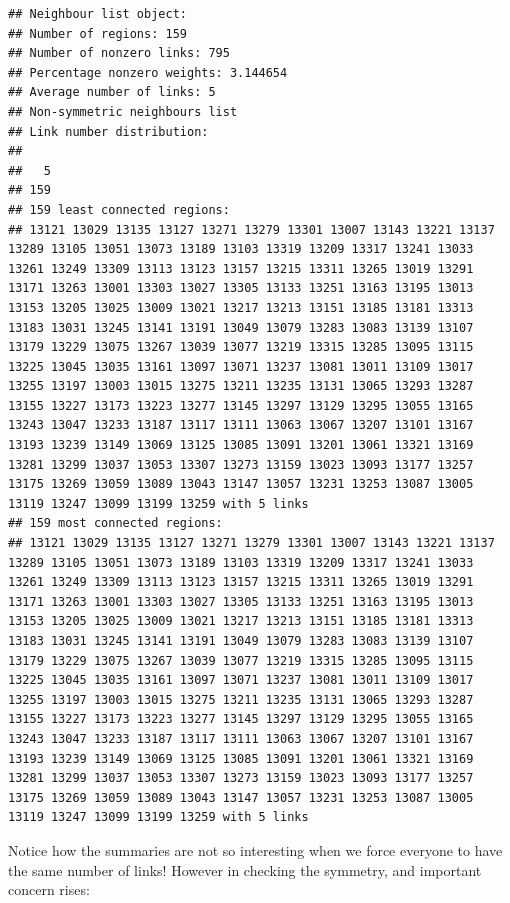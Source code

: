 \documentclass[
]{book}
\begin{document}
\begin{lstlisting}
## Neighbour list object:
## Number of regions: 159 
## Number of nonzero links: 795 
## Percentage nonzero weights: 3.144654 
## Average number of links: 5 
## Non-symmetric neighbours list
## Link number distribution:
## 
##   5 
## 159 
## 159 least connected regions:
## 13121 13029 13135 13127 13271 13279 13301 13007 13143 13221 13137 13289 13105 13051 13073 13189 13103 13319 13209 13317 13241 13033 13261 13249 13309 13113 13123 13157 13215 13311 13265 13019 13291 13171 13263 13001 13303 13027 13305 13133 13251 13163 13195 13013 13153 13205 13025 13009 13021 13217 13213 13151 13185 13181 13313 13183 13031 13245 13141 13191 13049 13079 13283 13083 13139 13107 13179 13229 13075 13267 13039 13077 13219 13315 13285 13095 13115 13225 13045 13035 13161 13097 13071 13237 13081 13011 13109 13017 13255 13197 13003 13015 13275 13211 13235 13131 13065 13293 13287 13155 13227 13173 13223 13277 13145 13297 13129 13295 13055 13165 13243 13047 13233 13187 13117 13111 13063 13067 13207 13101 13167 13193 13239 13149 13069 13125 13085 13091 13201 13061 13321 13169 13281 13299 13037 13053 13307 13273 13159 13023 13093 13177 13257 13175 13269 13059 13089 13043 13147 13057 13231 13253 13087 13005 13119 13247 13099 13199 13259 with 5 links
## 159 most connected regions:
## 13121 13029 13135 13127 13271 13279 13301 13007 13143 13221 13137 13289 13105 13051 13073 13189 13103 13319 13209 13317 13241 13033 13261 13249 13309 13113 13123 13157 13215 13311 13265 13019 13291 13171 13263 13001 13303 13027 13305 13133 13251 13163 13195 13013 13153 13205 13025 13009 13021 13217 13213 13151 13185 13181 13313 13183 13031 13245 13141 13191 13049 13079 13283 13083 13139 13107 13179 13229 13075 13267 13039 13077 13219 13315 13285 13095 13115 13225 13045 13035 13161 13097 13071 13237 13081 13011 13109 13017 13255 13197 13003 13015 13275 13211 13235 13131 13065 13293 13287 13155 13227 13173 13223 13277 13145 13297 13129 13295 13055 13165 13243 13047 13233 13187 13117 13111 13063 13067 13207 13101 13167 13193 13239 13149 13069 13125 13085 13091 13201 13061 13321 13169 13281 13299 13037 13053 13307 13273 13159 13023 13093 13177 13257 13175 13269 13059 13089 13043 13147 13057 13231 13253 13087 13005 13119 13247 13099 13199 13259 with 5 links
\end{lstlisting}

Notice how the summaries are not so interesting when we force everyone to have the same number of links! However in checking the symmetry, and important concern rises:
\end{document}
